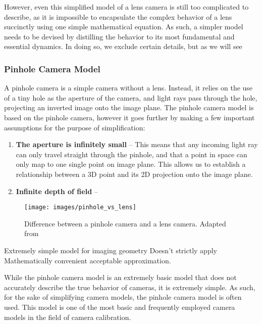 However, even this simplified model of a lens camera is still too complicated to describe, as it is impossible to encapsulate the complex behavior of a lens succinctly using one simple mathematical equation. As such, a simpler model needs to be devised by distilling the behavior to its most fundamental and essential dynamics. In doing so, we exclude certain details, but as we will see 

\subsubsection{Pinhole Camera Model}

A pinhole camera is a simple camera without a lens. Instead, it relies on the use of a tiny hole as the aperture of the camera, and light rays pass through the hole, projecting an inverted image onto the image plane. The pinhole camera model is based on the pinhole camera, however it goes further by making a few important assumptions for the purpose of simplification:

\begin{enumerate}[leftmargin=!, itemindent=-5ex]
    \item \textbf{The aperture is infinitely small} -- This means that any incoming light ray can only travel straight through the pinhole, and that a point in space can only map to one single point on image plane. This allows us to establish a relationship between a 3D point and its 2D projection onto the image plane. 
    \item \textbf{Infinite depth of field} -- 
\end{enumerate}
 

\begin{figure}
    \centering
    \texttt{[image: images/pinhole\_vs\_lens]}
    \caption{Difference between a pinhole camera and a lens camera. Adapted from \cite{leCameraModel2018}}
\end{figure}


Extremely simple model for imaging geometry
Doesn't strictly apply
Mathematically convenient acceptable approximation.


While the pinhole camera model is an extremely basic  model that does not accurately describe the true behavior of cameras, it is extremely simple. As such, for the sake of simplifying camera models, the pinhole camera model is often used. This model is one of the most basic and frequently employed camera models in the field of camera calibration. 








